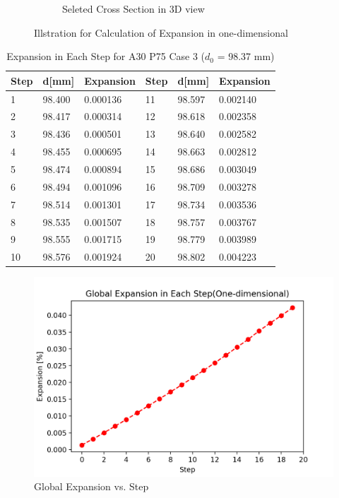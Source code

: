 \begin{figure}[!h]
\begin{subfigure}{.5\textwidth}
  \caption{Seleted Cross Section in 3D view}
\end{subfigure}
\caption{Illstration for Calculation of Expansion in one-dimensional}
\label{exp_illstration}
\end{figure}





  \begin{table}[ht]
      \caption{Expansion in Each Step for A30 P75 Case 3 ($d_0$ = 98.37 mm)}
  \centering
  \begin{tabular}{ ||p{2cm}|p{2cm}|p{2cm}||p{2cm}|p{2cm}|p{2cm}|| }
  \hline
   Step & d[mm] & Expansion & Step & d[mm] & Expansion \\
   \hline\hline
    1 & 98.400 & 0.000136  & 11 & 98.597 & 0.002140 \\
    2 & 98.417 & 0.000314  & 12 & 98.618 & 0.002358 \\
    3 & 98.436 & 0.000501  & 13 & 98.640 & 0.002582 \\
    4 & 98.455 & 0.000695  & 14 & 98.663 & 0.002812 \\
    5 & 98.474 & 0.000894  & 15 & 98.686 & 0.003049 \\
    6 & 98.494 & 0.001096  & 16 & 98.709 & 0.003278 \\
    7 & 98.514 & 0.001301  & 17 & 98.734 & 0.003536 \\
    8 & 98.535 & 0.001507  & 18 & 98.757 & 0.003767 \\
    9 & 98.555 & 0.001715  & 19 & 98.779 & 0.003989 \\
    10 & 98.576 & 0.001924  & 20  & 98.802 & 0.004223 \\
    \hline
    \end{tabular}

  \label{table:A30P75_3_EXPs}
  \end{table}

  \begin{figure}[ht!]
  \centering
  \includegraphics[width=.8\linewidth]{Files/exp_plot/ASRA30P75_3_exp.png}
    \caption{Global Expansion vs. Step}
    \label{fig:ASRA30P75_3_exp1}
  \end{figure}

